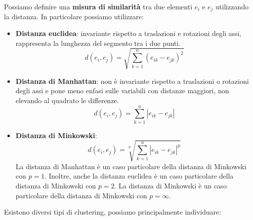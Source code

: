 \begin{definizione}
      Possiamo definire una \textbf{misura di similarità} tra due elementi $e_i$ e
      $e_j$ utilizzando la distanza. In particolare possiamo utilizzare:
      \begin{itemize}
            \item \textbf{Distanza euclidea}: invariante rispetto a traslazioni
                  e rotazioni degli assi, rappresenta la lunghezza del segmento
                  tra i due punti.
                  \begin{equation}
                        d(e_i, e_j) = \sqrt{\sum_{k=1}^n (e_{ik} - e_{jk})^2}
                  \end{equation}
            \item \textbf{Distanza di Manhattan}: non è invariante rispetto a
                  traslazioni o rotazioni degli assi e pone meno enfasi sulle
                  variabili con distanze maggiori, non elevando al quadrato le
                  differenze.
                  \begin{equation}
                        d(e_i, e_j) = \sum_{k=1}^n |e_{ik} - e_{jk}|
                  \end{equation}
            \item \textbf{Distanza di Minkowski}:
                  \begin{equation}
                        d(e_i, e_j) = \sqrt[p]{\sum_{k=1}^n |e_{ik} - e_{jk}|^p}
                  \end{equation}
                  La distanza di Manhattan è un caso particolare della distanza
                  di Minkowski con $p = 1$. Inoltre, anche la distanza euclidea
                  è un caso particolare della distanza di Minkowski con $p = 2$.
                  La distanza di Minkowski è un caso particolare della distanza
                  di Minkowski con $p = \infty$.
      \end{itemize}
\end{definizione}
Esistono diversi tipi di clustering, possiamo principalmente individuare:
